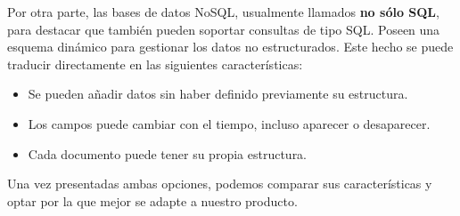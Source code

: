 Por otra parte, las bases de datos NoSQL, usualmente llamados \textbf{no sólo SQL}, para destacar que también pueden soportar consultas de tipo SQL. Poseen una esquema dinámico para gestionar los datos no estructurados. Este hecho se puede traducir directamente en las siguientes características:

\begin{itemize}
	\item Se pueden añadir datos sin haber definido previamente su estructura.
	\item Los campos puede cambiar con el tiempo, incluso aparecer o desaparecer.
	\item Cada documento puede tener su propia estructura.
\end{itemize}

Una vez presentadas ambas opciones, podemos comparar sus características y optar por la que mejor se adapte a nuestro producto.


